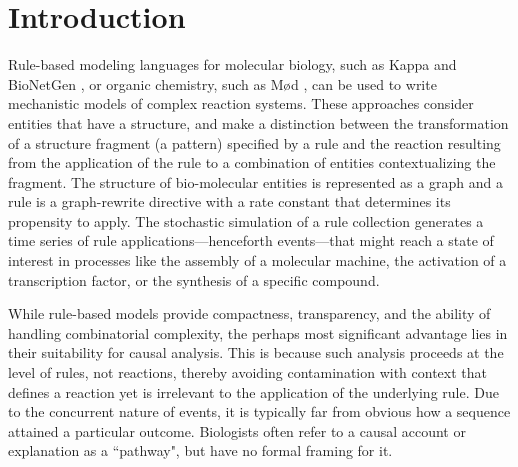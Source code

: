 
\section{Introduction}\label{sec:intro}

Rule-based modeling languages for molecular biology, such as Kappa
\cite{DanosEtAl-CONCUR07} and BioNetGen \cite{bngl}, or organic chemistry, such
as M{\o}d \cite{moll}, can be used to write mechanistic models of complex
reaction systems. These approaches consider entities that have a structure, and
make a distinction between the transformation of a structure fragment (a
pattern) specified by a rule and the reaction resulting from the application of
the rule to a combination of entities contextualizing the fragment. The
structure of bio-molecular entities is represented as a graph and a rule is a
graph-rewrite directive with a rate constant that determines its propensity to
apply. The stochastic simulation of a rule collection generates a time series of
rule applications---henceforth events---that might reach a state of interest in
processes like the assembly of a molecular machine, the activation of a
transcription factor, or the synthesis of a specific compound.

While rule-based models provide compactness, transparency, and the ability of
handling combinatorial complexity, the perhaps most significant advantage lies
in their suitability for causal analysis. This is because such analysis proceeds
at the level of rules, not reactions, thereby avoiding contamination with
context that defines a reaction yet is irrelevant to the application of the
underlying rule. Due to the concurrent nature of events, it is typically far from
obvious how a sequence attained a particular outcome. Biologists often refer to
a causal account or explanation as a ``pathway", but have no formal framing for
it.

